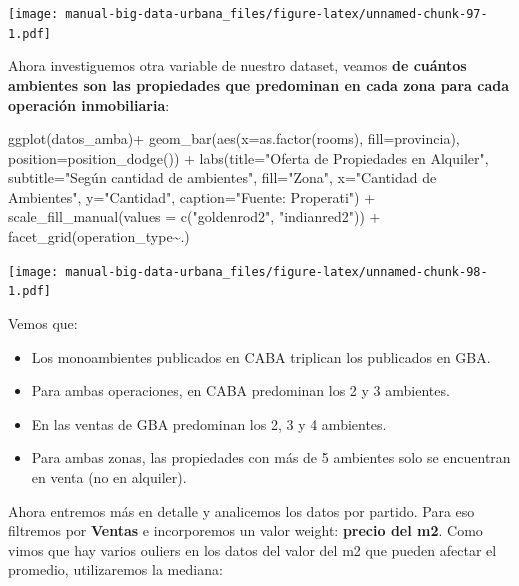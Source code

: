 \documentclass[
  spanish,
]{book}
\newenvironment{Shaded}{\begin{snugshade}}{\end{snugshade}}
\newcommand{\AttributeTok}[1]{\textcolor[rgb]{0.77,0.63,0.00}{#1}}
\newcommand{\FunctionTok}[1]{\textcolor[rgb]{0.00,0.00,0.00}{#1}}
\newcommand{\NormalTok}[1]{#1}
\newcommand{\SpecialCharTok}[1]{\textcolor[rgb]{0.00,0.00,0.00}{#1}}
\newcommand{\StringTok}[1]{\textcolor[rgb]{0.31,0.60,0.02}{#1}}
\providecommand{\tightlist}{%
  \setlength{\itemsep}{0pt}\setlength{\parskip}{0pt}}
\begin{document}
\texttt{[image: manual-big-data-urbana\_files/figure-latex/unnamed-chunk-97-1.pdf]}

Ahora investiguemos otra variable de nuestro dataset, veamos \textbf{de cuántos ambientes son las propiedades que predominan en cada zona para cada operación inmobiliaria}:

\begin{Shaded}
\begin{Highlighting}[]
\FunctionTok{ggplot}\NormalTok{(datos\_amba)}\SpecialCharTok{+}
  \FunctionTok{geom\_bar}\NormalTok{(}\FunctionTok{aes}\NormalTok{(}\AttributeTok{x=}\FunctionTok{as.factor}\NormalTok{(rooms), }\AttributeTok{fill=}\NormalTok{provincia), }\AttributeTok{position=}\FunctionTok{position\_dodge}\NormalTok{()) }\SpecialCharTok{+}
  \FunctionTok{labs}\NormalTok{(}\AttributeTok{title=}\StringTok{"Oferta de Propiedades en Alquiler"}\NormalTok{,}
       \AttributeTok{subtitle=}\StringTok{"Según cantidad de ambientes"}\NormalTok{,}
       \AttributeTok{fill=}\StringTok{"Zona"}\NormalTok{,}
       \AttributeTok{x=}\StringTok{"Cantidad de Ambientes"}\NormalTok{,}
       \AttributeTok{y=}\StringTok{"Cantidad"}\NormalTok{,}
       \AttributeTok{caption=}\StringTok{"Fuente: Properati"}\NormalTok{) }\SpecialCharTok{+}
  \FunctionTok{scale\_fill\_manual}\NormalTok{(}\AttributeTok{values =} \FunctionTok{c}\NormalTok{(}\StringTok{"goldenrod2"}\NormalTok{, }\StringTok{"indianred2"}\NormalTok{)) }\SpecialCharTok{+}
  \FunctionTok{facet\_grid}\NormalTok{(operation\_type}\SpecialCharTok{\textasciitilde{}}\NormalTok{.)}
\end{Highlighting}
\end{Shaded}

\texttt{[image: manual-big-data-urbana\_files/figure-latex/unnamed-chunk-98-1.pdf]}

Vemos que:

\begin{itemize}
\tightlist
\item
  Los monoambientes publicados en CABA triplican los publicados en GBA.
\item
  Para ambas operaciones, en CABA predominan los 2 y 3 ambientes.
\item
  En las ventas de GBA predominan los 2, 3 y 4 ambientes.
\item
  Para ambas zonas, las propiedades con más de 5 ambientes solo se encuentran en venta (no en alquiler).
\end{itemize}

Ahora entremos más en detalle y analicemos los datos por partido. Para eso filtremos por \textbf{Ventas} e incorporemos un valor weight: \textbf{precio del m2}. Como vimos que hay varios ouliers en los datos del valor del m2 que pueden afectar el promedio, utilizaremos la mediana:
\end{document}

